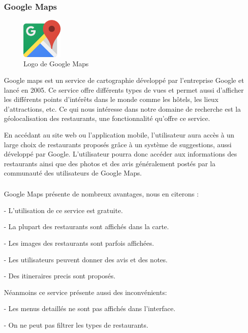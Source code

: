 \subsubsection{Google Maps}
\begin{figure}
	\vspace{-15pt}
	\includegraphics[width=2cm]{images/Chapitre1/googlemaps.png}
	\vspace{-20pt}
	\caption{{\footnotesize Logo de Google Maps}}
 \end{figure}
Google maps est un service de cartographie développé par l'entreprise Google et lancé en 2005. Ce service offre différents types de vues et permet aussi d'afficher les différents points d'intérêts dans le monde comme les hôtels, les lieux d'attractions, etc. Ce qui nous intéresse dans notre domaine de recherche est la géolocalisation des restaurants, une fonctionnalité qu'offre ce service.

En accédant au site web ou l'application mobile, l'utilisateur aura accès à un large choix de restaurants proposés grâce à un système de suggestions, aussi développé par Google. L'utilisateur pourra donc accéder aux informations des restaurants ainsi que des photos et des avis généralement postés par la communauté des utilisateurs de Google Maps.
\subparagraph*{}
Google Maps présente de nombreux avantages, nous en citerons :\bigskip
 
	\tab- L'utilisation de ce service est gratuite.\medskip

	\tab- La plupart des restaurants sont affichés dans la carte.\medskip

	\tab- Les images des restaurants sont parfois affichées.\medskip
	
	\tab- Les utilisateurs peuvent donner des avis et des notes.\medskip

	\tab- Des itineraires precis sont proposés.\bigskip

	
Néanmoins ce service présente aussi des inconvénients:\bigskip

	\tab- Les menus detaillés ne sont pas affichés dans l'interface.\medskip

	\tab- On ne peut pas filtrer les types de restaurants.\medskip


